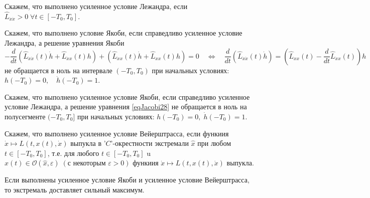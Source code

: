 \begin{task}
    \begin{definition}
        Скажем, что выполнено усиленное условие Лежандра,
        если $\widehat L_{\dot{x}\dot{x}} > 0 \; \forall t \in [-T_0, T_0]$.
    \end{definition}

    \begin{definition} Скажем, что выполнено условие Якоби,
        если справедливо усиленное условие Лежандра, а решение уравнения Якоби
        \begin{equation} \label{eqJacobi28}
            -\frac{d}{d t}\left(\widehat{L}_{\dot{x} \dot{x}}(t) \dot{h}
            +\widehat{L}_{\dot{x} x}(t) h\right)
            +\left(\widehat{L}_{\dot{x} x}(t) \dot{h}
            +\widehat{L}_{x x}(t) h\right)=0 \quad
            \Leftrightarrow \quad \frac{d}{d t}\left(\widehat{L}_{\dot{x} \dot{x}}(t) \dot{h}\right)
            =\left(\widehat{L}_{x x}(t)-\frac{d}{d t} \widehat{L}_{\dot{x} x}(t)\right) h
        \end{equation}
        не обращается в ноль на интервале $\left(-T_0, T_0\right)$ при начальных условиях:
        $h\left(-T_0\right)=0, \quad \dot{h}\left(-T_0\right)=1$.
    \end{definition}
    \begin{definition}
        Скажем, что выполнено усиленное условие Якоби, если справедливо усиленное условие
        Лежандра, а решение уравнения \eqref{eqJacobi28} не обращается в ноль на полусегменте
        $(-T_0, T_0]$ при начальных условиях: ${h(-T_0)=0, \; \dot{h}(-T_0)=1}$.
    \end{definition}

    \begin{definition}
        Скажем, что выполнено усиленное условие Вейерштрасса,
        если функиия $\dot{x} \mapsto L(t, x(t), \dot{x})$
        выпукла в '$C$'-окрестности экстремали $\widehat{x}$
        при любом $t \in\left[-T_0, T_0\right]$, т.е. для любого
        $t \in\left[-T_0, T_0\right]$ u $x(t) \in
            \mathcal{O}(\widehat{x}, \varepsilon) \;
            (\text {с некоторым } {\varepsilon>0})$ функиия
        $\dot{x} \mapsto L(t, x(t), \dot{x})$ выпукла.
    \end{definition}

    \begin{theorem}
        Если выполнены усиленное
        условие Якоби и усиленное условие Вейерштрасса, то экстремаль доставляет
        сильный максимум.
    \end{theorem}


\end{task}
